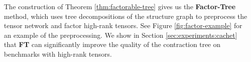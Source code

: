 


The construction of Theorem \ref{thm:factorable-tree} gives us the \textbf{Factor-Tree} method, which uses tree decompositions of the structure graph to preprocess the tensor network and factor high-rank tensors. See Figure \ref{fig:factor-example} for an example of the preprocessing. We show in Section \ref{sec:experiments:cachet} that \textbf{FT} can significantly improve the quality of the contraction tree on benchmarks with high-rank tensors.